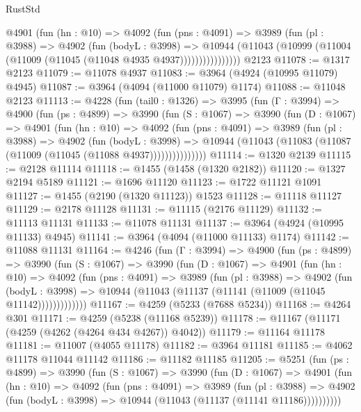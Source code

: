 \begin{lexlean}{RustStd}
\begin{coremodule}
{\begin{coremodule}
{{{{{{{{{{{{{{{{{{{{{{{{{{{{{{{{{{{{{{              @4901
                (fun (hn : @10) =>
                @4092
                  (fun (pns : @4091) =>
                  @3989
                    (fun (pl : @3988) =>
                    @4902
                      (fun (bodyL : @3998) =>
                      @10944
                        (@11043 (@10999 (@11004 (@11009 (@11045 (@11048 @4935 @4937))))))))))))))))
    @2123
@11078 := @1317 @2123
@11079 := @11078 @4937
@11083 := @3964 (@4924 (@10995 @11079) @4945)
@11087 := @3964 (@4094 (@11000 @11079) @1174)
@11088 := @11048 @2123
@11113 := @4228
    (fun (tail0 : @1326) =>
    @3995
      (fun (Γ : @3994) =>
      @4900
        (fun (ps : @4899) =>
        @3990
          (fun (S : @1067) =>
          @3990
            (fun (D : @1067) =>
            @4901
              (fun (hn : @10) =>
              @4092
                (fun (pns : @4091) =>
                @3989
                  (fun (pl : @3988) =>
                  @4902
                    (fun (bodyL : @3998) =>
                    @10944 (@11043 (@11083 (@11087 (@11009 (@11045 (@11088 @4937)))))))))))))))
@11114 := @1320 @2139
@11115 := @2128 @11114
@11118 := @1455 (@1458 (@1320 @2182))
@11120 := @1327 @2194 @5189
@11121 := @1696 @11120
@11123 := @1722 @11121 @1091
@11127 := @1455 (@2190 (@1320 @11123)) @1523
@11128 := @11118 @11127
@11129 := @2178 @11128
@11131 := @11115 (@2176 @11129)
@11132 := @11113 @11131
@11133 := @11078 @11131
@11137 := @3964 (@4924 (@10995 @11133) @4945)
@11141 := @3964 (@4094 (@11000 @11133) @1174)
@11142 := @11088 @11131
@11164 := @4246
    (fun (Γ : @3994) =>
    @4900
      (fun (ps : @4899) =>
      @3990
        (fun (S : @1067) =>
        @3990
          (fun (D : @1067) =>
          @4901
            (fun (hn : @10) =>
            @4092
              (fun (pns : @4091) =>
              @3989
                (fun (pl : @3988) =>
                @4902
                  (fun (bodyL : @3998) =>
                  @10944 (@11043 (@11137 (@11141 (@11009 (@11045 @11142)))))))))))))
@11167 := @4259 (@5233 (@7688 @5234))
@11168 := @4264 @301
@11171 := @4259 (@5238 (@11168 @5239))
@11178 := @11167 (@11171 (@4259 (@4262 (@4264 @434 @4267)) @4042))
@11179 := @11164 @11178
@11181 := @11007 (@4055 @11178)
@11182 := @3964 @11181
@11185 := @4062 @11178 @11044 @11142
@11186 := @11182 @11185
@11205 := @5251
    (fun (ps : @4899) =>
    @3990
      (fun (S : @1067) =>
      @3990
        (fun (D : @1067) =>
        @4901
          (fun (hn : @10) =>
          @4092
            (fun (pns : @4091) =>
            @3989
              (fun (pl : @3988) =>
              @4902 (fun (bodyL : @3998) => @10944 (@11043 (@11137 (@11141 @11186))))))))))
}}}}}}}}}}}}}}}}}}}}}}}}}}}}}}}}}}}}}}
\end{coremodule}}
\end{coremodule}
\end{lexlean}

